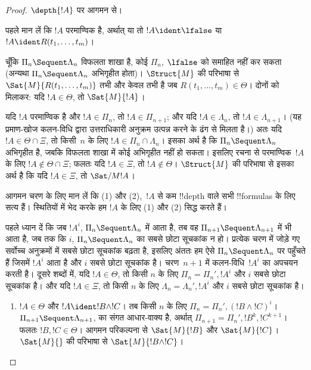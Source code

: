 \documentclass[../../../include/open-logic-section]{subfiles}
\begin{document}
\begin{proof}
  $\depth{!A}$ पर आगमन से।

पहले मान लें कि $!A$ परमाण्विक है, अर्थात् या तो $!A \ident \lfalse$ या $!A
\ident R(t_1, \dots, t_m)$।

चूँकि $\Pi_n \Sequent \Lambda_n$ विफलता शाखा है, कोई $\Pi_n$, $\lfalse$ को
समाहित नहीं कर सकता (अन्यथा $\Pi_n \Sequent \Lambda_n$ अभिगृहीत होता)।
$\Struct{M}$ की परिभाषा से $\Sat{M}{R(t_1, \dots, t_m)}$ तभी और केवल तभी है
जब $R(t_1, \dots, t_m) \in \Theta$। दोनों को मिलाकर: यदि $!A \in \Theta$,
तो $\Sat{M}{!A}$।

यदि $!A$ परमाण्विक है और $!A \in \Pi_n$, तो $!A \in \Pi_{n+1}$; और यदि
$!A \in \Lambda_n$, तो $!A \in \Lambda_{n+1}$। (यह प्रमाण-खोज कलन-विधि
द्वारा उत्तराधिकारी अनुक्रम उत्पन्न करने के ढंग से मिलता है।) अतः यदि $!A
\in \Theta \cap \Xi$, तो किसी~$n$ के लिए $!A \in \Pi_n \cap \Lambda_n$।
इसका अर्थ है कि $\Pi_n \Sequent \Lambda_n$ अभिगृहीत है, जबकि विफलता शाखा में
कोई अभिगृहीत नहीं हो सकता। इसलिए रचना से परमाण्विक~$!A$ के लिए $!A \notin
\Theta \cap \Xi$; फलतः यदि $!A \in \Xi$, तो $!A \notin \Theta$।
$\Struct{M}$ की परिभाषा से इसका अर्थ है कि यदि $!A \in \Xi$, तो
$\Sat/{M}{!A}$।

आगमन चरण के लिए मान लें कि (1) और (2),~$!A$ से कम !!{depth} वाले सभी
!!{formula}s के लिए सत्य हैं। स्थितियों में भेद करके हम $!A$ के लिए (1) और
(2) सिद्ध करते हैं।

पहले ध्यान दें कि जब $!A^i$, $\Pi_n \Sequent \Lambda_n$ में आता है, तब वह
$\Pi_{n+1} \Sequent \Lambda_{n+1}$ में भी आता है, जब तक कि $i$, $\Pi_n
\Sequent \Lambda_n$ का सबसे छोटा सूचकांक न हो। प्रत्येक चरण में जोड़े गए
सर्वोच्च अनुक्रमों में सबसे छोटा सूचकांक बढ़ता है, इसलिए अंततः हम ऐसे $\Pi_n
\Sequent \Lambda_n$ पर पहुँचते हैं जिसमें $!A^i$ आता है और $i$ सबसे छोटा
सूचकांक है। चरण~$n+1$ में कलन-विधि~$!A^i$ का अपचयन करती है। दूसरे शब्दों में,
यदि $!A \in \Theta$, तो किसी $n$ के लिए $\Pi_n = \Pi_n', !A^i$ और $i$
सबसे छोटा सूचकांक है। और यदि $!A \in \Xi$, तो किसी $n$ के लिए $\Lambda_n =
\Lambda_n', !A^i$ और $i$ सबसे छोटा सूचकांक है।

\begin{enumerate}
  \item $!A \in \Theta$ और $!A \ident !B \land !C$। तब किसी $n$ के लिए
  $\Pi_n = \Pi_n', (!B \land !C)^i$। $\Pi_{n+1} \Sequent \Lambda_{n+1}$,
  \LeftR{\land} का संगत आधार-वाक्य है, अर्थात् $\Pi_{n+1} = \Pi_n', !B^k,
  !C^{k+1}$। फलतः $!B, !C \in \Theta$। आगमन परिकल्पना से $\Sat{M}{!B}$ और
  $\Sat{M}{!C}$। $\Sat{M}{}$ की परिभाषा से $\Sat{M}{!B \land !C}$।


\end{enumerate}
\end{proof}
\end{document}
